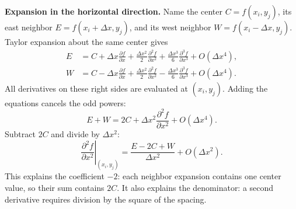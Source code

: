 \textbf{Expansion in the horizontal direction.} Name the center $C=f(x_i,y_j)$, its east neighbor $E=f(x_i+\Delta x,y_j)$, and its west neighbor $W=f(x_i-\Delta x,y_j)$. Taylor expansion about the same center gives
\begin{align*}
E&=C+\Delta x\frac{\partial f}{\partial x}
+\frac{\Delta x^2}{2}\frac{\partial^2f}{\partial x^2}
+\frac{\Delta x^3}{6}\frac{\partial^3f}{\partial x^3}+O(\Delta x^4),\\
W&=C-\Delta x\frac{\partial f}{\partial x}
+\frac{\Delta x^2}{2}\frac{\partial^2f}{\partial x^2}
-\frac{\Delta x^3}{6}\frac{\partial^3f}{\partial x^3}+O(\Delta x^4).
\end{align*}
All derivatives on these right sides are evaluated at $(x_i,y_j)$. Adding the equations cancels the odd powers:
\[
E+W=2C+\Delta x^2\frac{\partial^2f}{\partial x^2}+O(\Delta x^4).
\]
Subtract $2C$ and divide by $\Delta x^2$:
\[
\boxed{\left.\frac{\partial^2f}{\partial x^2}\right|_{(x_i,y_j)}
=\frac{E-2C+W}{\Delta x^2}+O(\Delta x^2).}
\]
This explains the coefficient $-2$: each neighbor expansion contains one center value, so their sum contains $2C$. It also explains the denominator: a second derivative requires division by the square of the spacing.

